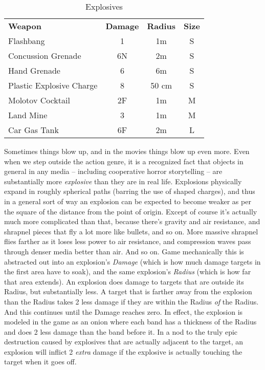 \begin{wraptable}[11]{R}{10cm}\vspace{-.5cm}
 \caption{Explosives} \centering
\begin{tabular}{l c c c}
\textbf{Weapon}&\textbf{Damage}&\textbf{Radius}&\textbf{Size} \\
Flashbang & 1 & 1m & S \\
Concussion Grenade & 6N & 2m & S \\
Hand Grenade & 6 & 6m & S \\
Plastic Explosive Charge & 8 & 50 cm & S \\
Molotov Cocktail & 2F & 1m & M \\
Land Mine & 3 & 1m & M \\
Car Gas Tank & 6F & 2m & L \\
\end{tabular}
\end{wraptable}

Sometimes things blow up, and in the movies things blow up even more. Even when we step outside the action genre, it is a recognized fact that objects in general in any media -- including cooperative horror storytelling -- are substantially more \textit{explosive} than they are in real life. Explosions physically expand in roughly spherical paths (barring the use of shaped charges), and thus in a general sort of way an explosion can be expected to become weaker as per the square of the distance from the point of origin. Except of course it's actually much more complicated than that, because there's gravity and air resistance, and shrapnel pieces that fly a lot more like bullets, and so on. More massive shrapnel flies farther as it loses less power to air resistance, and compression waves pass through denser media better than air. And so on. Game mechanically this is abstracted out into an explosion's \textit{Damage} (which is how much damage targets in the first area have to soak), and the same explosion's \textit{Radius} (which is how far that area extends). An explosion does damage to targets that are outside its Radius, but substantially less. A target that is farther away from the explosion than the Radius takes 2 less damage if they are within the Radius \textit{of} the Radius. And this continues until the Damage reaches zero. In effect, the explosion is modeled in the game as an onion where each band has a thickness of the Radius and does 2 less damage than the band before it. In a nod to the truly epic destruction caused by explosives that are actually adjacent to the target, an explosion will inflict 2 \textit{extra} damage if the explosive is actually touching the target when it goes off.

